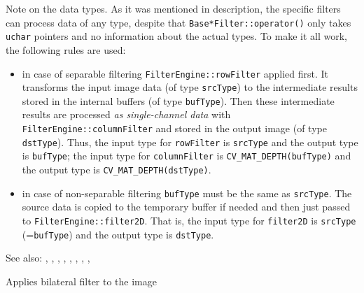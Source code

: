 Note on the data types. As it was mentioned in  description, the specific filters can process data of any type, despite that \texttt{Base*Filter::operator()} only takes \texttt{uchar} pointers and no information about the actual types. To make it all work, the following rules are used:

\begin{itemize}
    \item in case of separable filtering \texttt{FilterEngine::rowFilter} applied first. It transforms the input image data (of type \texttt{srcType}) to the intermediate results stored in the internal buffers (of type \texttt{bufType}). Then these intermediate results are processed \emph{as single-channel data} with \texttt{FilterEngine::columnFilter} and stored in the output image (of type \texttt{dstType}). Thus, the input type for \texttt{rowFilter} is \texttt{srcType} and the output type is \texttt{bufType}; the input type for \texttt{columnFilter} is \texttt{CV\_MAT\_DEPTH(bufType)} and the output type is \texttt{CV\_MAT\_DEPTH(dstType)}.
    
    \item in case of non-separable filtering \texttt{bufType} must be the same as \texttt{srcType}. The source data is copied to the temporary buffer if needed and then just passed to \texttt{FilterEngine::filter2D}. That is, the input type for \texttt{filter2D} is \texttt{srcType} (=\texttt{bufType}) and the output type is \texttt{dstType}.
\end{itemize}

See also: , , , ,
, , ,
, 

Applies bilateral filter to the image

